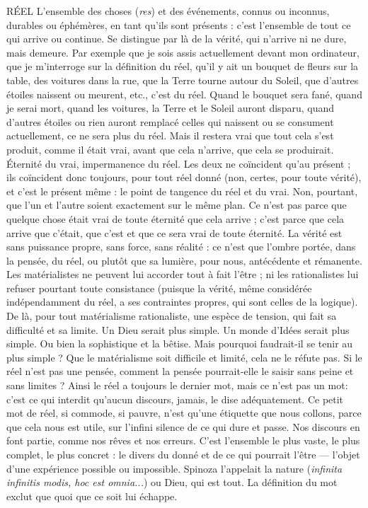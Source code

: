 RÉEL L'ensemble des choses ({\it res}) et des événements, connus ou inconnus,
durables ou éphémères, en tant qu’ils sont présents : c’est l’ensemble
de tout ce qui arrive ou continue. Se distingue par là de la vérité, qui n’arrive ni
ne dure, mais demeure. Par exemple que je sois assis actuellement devant mon
ordinateur, que je m’interroge sur la définition du réel, qu’il y ait un bouquet de
fleurs sur la table, des voitures dans la rue, que la Terre tourne autour du Soleil,
que d’autres étoiles naissent ou meurent, etc., c'est du réel. Quand le bouquet
sera fané, quand je serai mort, quand les voitures, la Terre et le Soleil auront disparu,
quand d’autres étoiles ou rien auront remplacé celles qui naissent ou se consument
actuellement, ce ne sera plus du réel. Mais il restera vrai que tout cela s’est
produit, comme il était vrai, avant que cela n'arrive, que cela se produirait. Éternité
du vrai, impermanence du réel. Les deux ne coïncident qu’au présent ; ils
coïncident donc toujours, pour tout réel donné (non, certes, pour toute vérité),
et c’est le présent même : le point de tangence du réel et du vrai. Non, pourtant,
que l’un et l’autre soient exactement sur le même plan. Ce n’est pas parce que
quelque chose était vrai de toute éternité que cela arrive ; c’est parce que cela
arrive que c'était, que c’est et que ce sera vrai de toute éternité. La vérité est sans
puissance propre, sans force, sans réalité : ce n’est que l’ombre portée, dans la
pensée, du réel, ou plutôt que sa lumière, pour nous, antécédente et rémanente.
Les matérialistes ne peuvent lui accorder tout à fait l’être ; ni les rationalistes lui
refuser pourtant toute consistance (puisque la vérité, même considérée indépendamment
du réel, a ses contraintes propres, qui sont celles de la logique). De là,
pour tout matérialisme rationaliste, une espèce de tension, qui fait sa difficulté et
sa limite. Un Dieu serait plus simple. Un monde d’Idées serait plus simple. Ou
bien la sophistique et la bêtise. Mais pourquoi faudrait-il se tenir au plus simple ?
Que le matérialisme soit difficile et limité, cela ne le réfute pas. Si le réel n’est pas
une pensée, comment la pensée pourrait-elle le saisir sans peine et sans limites ?
Ainsi le réel a toujours le dernier mot, mais ce n’est pas un mot: c’est ce qui
interdit qu'aucun discours, jamais, le dise adéquatement. Ce petit mot de réel, si
commode, si pauvre, n’est qu’une étiquette que nous collons, parce que cela nous
est utile, sur l'infini silence de ce qui dure et passe. Nos discours en font partie,
comme nos rêves et nos erreurs. C’est l’ensemble le plus vaste, le plus complet, le
plus concret : le divers du donné et de ce qui pourrait l’être — l’objet d’une expérience
possible ou impossible. Spinoza l’appelait la nature ({\it infinita infinitis modis,
hoc est omnia...}) ou Dieu, qui est tout. La définition du mot exclut que quoi que
ce soit lui échappe.

